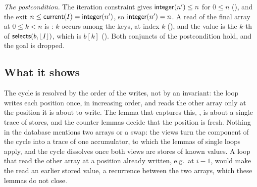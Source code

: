\emph{The postcondition.} The iteration constraint gives $\mathsf{integer}(n') \le n$ for $0 \le n$
(), and the exit $n \le \mathsf{current}(I) = \mathsf{integer}(n')$, so $\mathsf{integer}(n') = n$. A read of
the final array at $0 \le k < n$ is : $k$ occurs among the keys, at index $k$
(), and the value is the $k$-th of $\mathsf{selects}(b, \lfloor I\rfloor)$, which is $b[k]$
(). Both conjuncts of the postcondition hold, and the goal is dropped.

\subsection{What it shows}
The cycle is resolved by the order of the writes, not by an invariant: the loop writes each position once, in
increasing order, and reads the other array only at the position it is about to write. The lemma that captures
this, , is about a single trace of stores, and the counter lemmas decide that the position is
fresh. Nothing in the database mentions two arrays or a swap: the views turn the component of the cycle into a
trace of one accumulator, to which the lemmas of single loops apply, and the cycle dissolves once both views are
stores of known values. A loop that read the other array at a position already written, e.g.\ at $i - 1$, would
make the read an earlier stored value, a recurrence between the two arrays, which these lemmas do not close.
